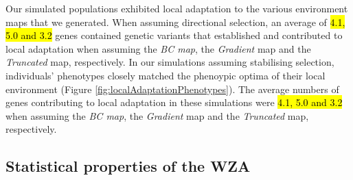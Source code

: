 \documentclass[10pt,twoside,lineno, twocolumn]{GSA_format}
\begin{document}
Our simulated populations exhibited local adaptation to the various environment maps that we generated. When assuming directional selection, an average of \hl{ 4.1, 5.0 and 3.2} genes contained genetic variants that established and contributed to local adaptation when assuming the \textit{BC map}, the \textit{Gradient} map and the \textit{Truncated} map, respectively. In our simulations assuming stabilising selection, individuals' phenotypes closely matched the phenoypic optima of their local environment (Figure \ref{fig:localAdaptationPhenotypes}). The average numbers of genes contributing to local adaptation in these simulations were \hl{ 4.1, 5.0 and 3.2} when assuming the \textit{BC map}, the \textit{Gradient} map and the \textit{Truncated} map, respectively.

\subsection{Statistical properties of the WZA}
\end{document}
